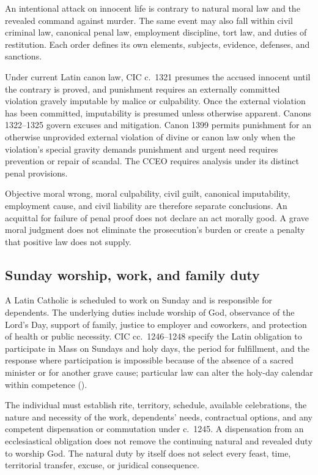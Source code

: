 An intentional attack on innocent life is contrary to natural moral law and the revealed command against murder. The same event may also fall within civil criminal law, canonical penal law, employment discipline, tort law, and duties of restitution. Each order defines its own elements, subjects, evidence, defenses, and sanctions.

Under current Latin canon law, CIC c.~1321 presumes the accused innocent until the contrary is proved, and punishment requires an externally committed violation gravely imputable by malice or culpability. Once the external violation has been committed, imputability is presumed unless otherwise apparent. Canons 1322--1325 govern excuses and mitigation. Canon 1399 permits punishment for an otherwise unprovided external violation of divine or canon law only when the violation's special gravity demands punishment and urgent need requires prevention or repair of scandal. The CCEO requires analysis under its distinct penal provisions.

Objective moral wrong, moral culpability, civil guilt, canonical imputability, employment cause, and civil liability are therefore separate conclusions. An acquittal for failure of penal proof does not declare an act morally good. A grave moral judgment does not eliminate the prosecution's burden or create a penalty that positive law does not supply.

\subsection{Sunday worship, work, and family duty}

A Latin Catholic is scheduled to work on Sunday and is responsible for dependents. The underlying duties include worship of God, observance of the Lord's Day, support of family, justice to employer and coworkers, and protection of health or public necessity. CIC cc.~1246--1248 specify the Latin obligation to participate in Mass on Sundays and holy days, the period for fulfillment, and the response where participation is impossible because of the absence of a sacred minister or for another grave cause; particular law can alter the holy-day calendar within competence ().

The individual must establish rite, territory, schedule, available celebrations, the nature and necessity of the work, dependents' needs, contractual options, and any competent dispensation or commutation under c.~1245. A dispensation from an ecclesiastical obligation does not remove the continuing natural and revealed duty to worship God. The natural duty by itself does not select every feast, time, territorial transfer, excuse, or juridical consequence.

